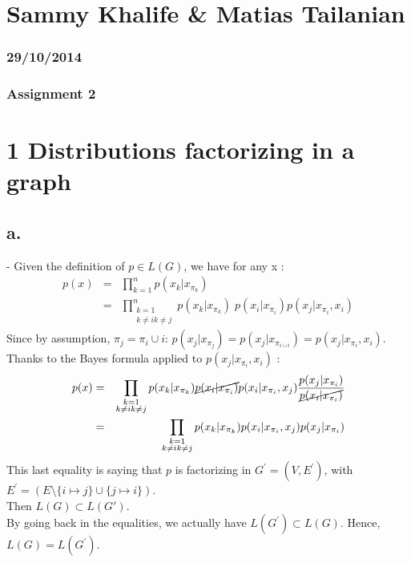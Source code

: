 \documentclass[12pt]{article}
\begin{document}
\section*{Sammy Khalife \& Matias Tailanian}
\subsubsection*{29/10/2014}
\subsubsection*{Assignment 2}
\section*{1 Distributions factorizing in a graph} 
\subsection*{a.}
- Given the definition of $p \in L(G)$, we have for any x :
\begin{eqnarray*}
p(x) & = & \prod_{k=1}^{n}p(x_{k}|x_{\pi_{k}})\\
& = &  \prod \limits^n_{\substack{k=1 \\ k \neq i k \neq j} }p(x_{k}|x_{\pi_{k}}) \; p(x_{i}|x_{\pi_{i}})p(x_{j}|x_{\pi_{i}},x_{i})
\end{eqnarray*}
Since by assumption, $\pi_{j}=\pi_{i} \cup {i}$: $p(x_j|x_{\pi_j})=p(x_j|x_{\pi_{i\cup i}})=p(x_j|x_{\pi_i},x_i)$.~\\
Thanks to the Bayes formula applied to $p(x_{j}|x_{\pi_{i}}, x_{i})$ :
\begin{eqnarray*}
p(x) & = & \prod \limits_{\substack{k=1 \\ k \neq i k \neq j} } p(x_{k}|x_{\pi_{k}})        
\cancel {p(x_{i}|x_{\pi_{i}})}
p(x_{i}|x_{\pi_{i}},x_{j})\frac{p(x_{j}|x_{\pi_{i}})}{\cancel{p(x_{i}|x_{\pi_{i}})}}\\
& = &  \prod \limits_{\substack{k=1 \\ k \neq i k \neq j} } p(x_{k}|x_{\pi_{k}})p(x_{i}|x_{\pi_{i}},x_{j})p(x_{j}|x_{\pi_{i}})
\end{eqnarray*}
This last equality is saying that $p$ is factorizing in $G^{'}=(V,E^{'})$, with $E^{'} = (E \setminus \{ i \mapsto j \}\cup\{j\mapsto i\})$. ~\\
Then $L(G) \subset L(G')$.~\\
By going back in the equalities, we actually have $L(G^{'}) \subset L(G)$.
Hence, $L(G)=L(G^{'})$.
~\\
\end{document}
